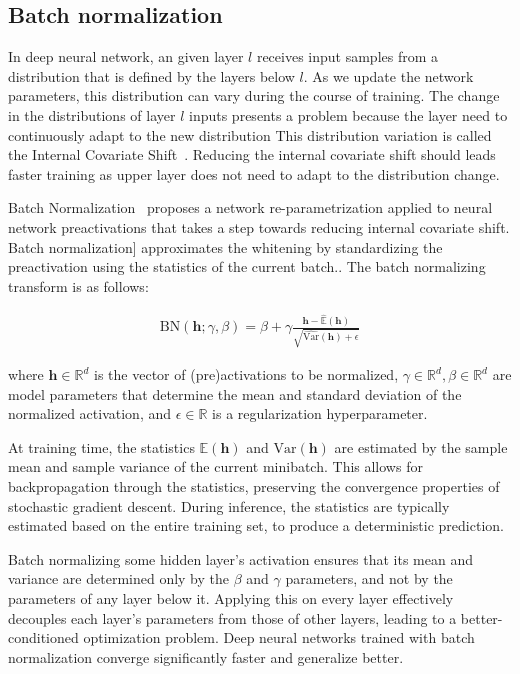 \documentclass{article} %
\newcommand{\vect}[1]{\mathbf{#1}}
\newcommand{\reals}{\mathbb{R}}
\begin{document}
\subsection{Batch normalization}

In deep neural network, an given layer $l$ receives input samples from a distribution that is defined by the layers below $l$.
As we update the network parameters, this distribution can vary during the course of training.
The change in the distributions of layer $l$ inputs presents a problem because the layer need to continuously adapt to the new distribution
This distribution variation is called the Internal Covariate Shift~\cite{shimodaira2000improving}.
Reducing the internal covariate shift should leads  faster training as upper layer does not need to adapt to the distribution change.

Batch Normalization~\cite{batchnorm} proposes a network re-parametrization applied to neural network preactivations that takes a step towards reducing
internal covariate shift. Batch normalization] approximates the
whitening by standardizing the preactivation using the statistics of the current batch..
The batch normalizing transform is as follows:

\begin{align}
\mathrm{BN}(\vect{h}; \gamma, \beta) =
  \beta + \gamma
  \frac{\vect{h} -   \widehat{\mathbb{E}}(\vect{h})}
       {       \sqrt{\widehat{\mathrm{Var }}(\vect{h}) + \epsilon}}
\end{align}

where $\vect{h} \in \reals^d$ is the vector of (pre)activations to be normalized, $\gamma \in \reals^d, \beta \in \reals^d$ are model parameters that determine the mean and standard deviation of the normalized activation, and $\epsilon \in \reals$ is a regularization hyperparameter.

At training time, the statistics $\mathbb{E}(\vect{h})$ and $\mathrm{Var}(\vect{h})$ are estimated by the sample mean and sample variance of the current minibatch.
This allows for backpropagation through the statistics, preserving the convergence properties of stochastic gradient descent.
During inference, the statistics are typically estimated based on the entire training set, to produce a deterministic prediction.

Batch normalizing some hidden layer's activation ensures that its mean and variance are determined only by the $\beta$ and $\gamma$ parameters, and not by the parameters of any layer below it.
Applying this on every layer effectively decouples each layer's parameters from those of other layers, leading to a better-conditioned optimization problem.
Deep neural networks trained with batch normalization converge significantly faster and generalize better.
\end{document}
